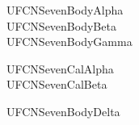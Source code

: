 \documentclass{abntexto-ufc}
\begin{document}
\textual

\noindent UFCNSevenBodyAlpha\\
UFCNSevenBodyBeta\\
UFCNSevenBodyGamma\par

\vspace{2\baselineskip}
\begingroup
\singlesp
\noindent UFCNSevenCalAlpha\\
UFCNSevenCalBeta\par
\endgroup

\newpage
\noindent UFCNSevenBodyDelta
\end{document}
